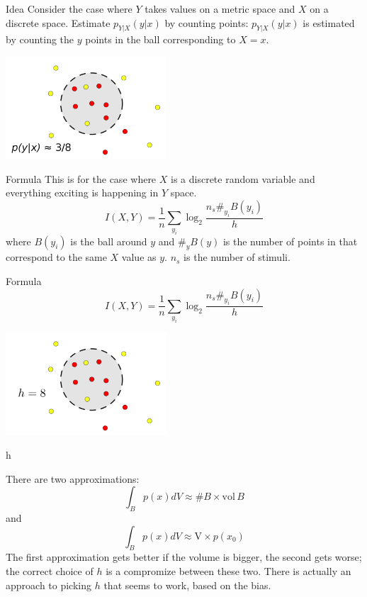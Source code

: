 \documentclass{beamer}
\begin{document}
\begin{frame}{Idea}
  \vskip 1cm
Consider the case where $Y$ takes values on a metric space and $X$ on a discrete space.
  \vskip 1cm
  Estimate $p_{Y|X}(y|x)$ by counting points: $p_{Y|X}(y|x)$ is estimated by counting the $y$ points in the ball corresponding to $X=x$.  
\color{black}
\begin{center}
\includegraphics[width=6cm]{dots_prob.png}
\end{center}
\end{frame}


\begin{frame}{Formula}
This is for the case where $X$ is a discrete random variable and
everything exciting is happening in $Y$ space.
\color{dark}
$$I(X,Y)=\frac{1}{n}\sum_{y_i}\log_2{\frac{n_s\#_{y_i}B(y_i)}{h}}$$
\color{black} where $B(y_i)$ is the ball around $y$ and $\#_y{B(y)}$
  is the number of points in that correspond to the same $X$ value as
  $y$. $n_s$ is the number of stimuli.
\end{frame}


\begin{frame}{Formula}
\color{dark}
$$I(X,Y)=\frac{1}{n}\sum_{y_i}\log_2{\frac{n_s \#_{y_i}B(y_i)}{h}}$$
\color{black}
\begin{center}
\includegraphics[width=6cm]{dots.png}
\end{center}
\end{frame}


\begin{frame}{h}

  There are two approximations:
  \color{dark}
$$\int_B p(x)dV \approx \# B\times \mbox{vol}\,B$$
\color{black}
  and
\color{dark}
  $$\int_B p(x)dV \approx \mbox{V}\times p(x_0)$$ 
\color{black}
The first approximation gets better if the volume is bigger, the
second gets worse; the correct choice of $h$ is a compromize between
these two. There is actually an approach to picking $h$ that
seems to work, based on the bias.
\end{frame}
\end{document}
